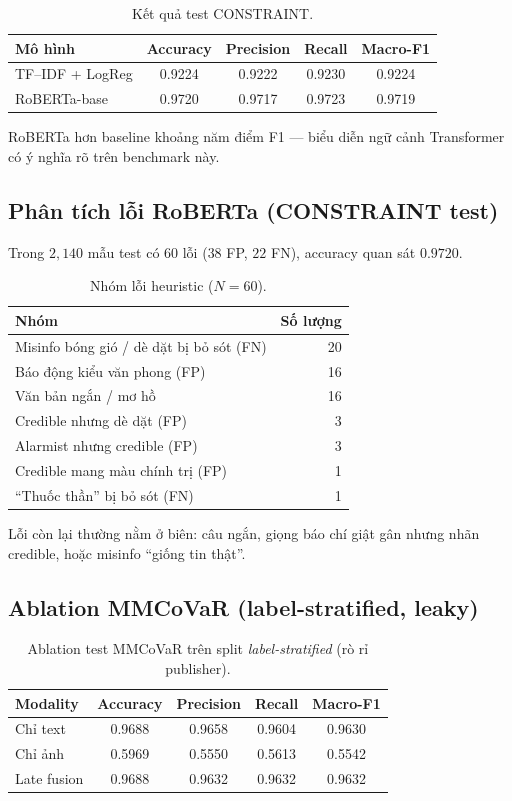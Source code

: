 \documentclass[12pt, a4paper]{report}
\begin{document}
\begin{table}[htbp]
\centering
\caption{Kết quả test CONSTRAINT.}
\label{tab:constraint-results}
\begin{tabular}{lcccc}
\hline
Mô hình & Accuracy & Precision & Recall & Macro-F1 \\
\hline
TF--IDF + LogReg & 0.9224 & 0.9222 & 0.9230 & 0.9224 \\
RoBERTa-base & 0.9720 & 0.9717 & 0.9723 & 0.9719 \\
\hline
\end{tabular}
\end{table}

RoBERTa hơn baseline khoảng năm điểm F1 --- biểu diễn ngữ cảnh Transformer có ý nghĩa rõ trên benchmark này.

\subsection{Phân tích lỗi RoBERTa (CONSTRAINT test)}

Trong $2{,}140$ mẫu test có $60$ lỗi ($38$ FP, $22$ FN), accuracy quan sát $0.9720$.

\begin{table}[htbp]
\centering
\caption{Nhóm lỗi heuristic ($N=60$).}
\label{tab:error-cats}
\begin{tabular}{lr}
\hline
Nhóm & Số lượng \\
\hline
Misinfo bóng gió / dè dặt bị bỏ sót (FN) & 20 \\
Báo động kiểu văn phong (FP) & 16 \\
Văn bản ngắn / mơ hồ & 16 \\
Credible nhưng dè dặt (FP) & 3 \\
Alarmist nhưng credible (FP) & 3 \\
Credible mang màu chính trị (FP) & 1 \\
``Thuốc thần'' bị bỏ sót (FN) & 1 \\
\hline
\end{tabular}
\end{table}

Lỗi còn lại thường nằm ở biên: câu ngắn, giọng báo chí giật gân nhưng nhãn credible, hoặc misinfo ``giống tin thật''.

\subsection{Ablation MMCoVaR (label-stratified, leaky)}

\begin{table}[htbp]
\centering
\caption{Ablation test MMCoVaR trên split \emph{label-stratified} (rò rỉ publisher).}
\label{tab:ablation}
\begin{tabular}{lcccc}
\hline
Modality & Accuracy & Precision & Recall & Macro-F1 \\
\hline
Chỉ text & 0.9688 & 0.9658 & 0.9604 & 0.9630 \\
Chỉ ảnh & 0.5969 & 0.5550 & 0.5613 & 0.5542 \\
Late fusion & 0.9688 & 0.9632 & 0.9632 & 0.9632 \\
\hline
\end{tabular}
\end{table}
\end{document}
